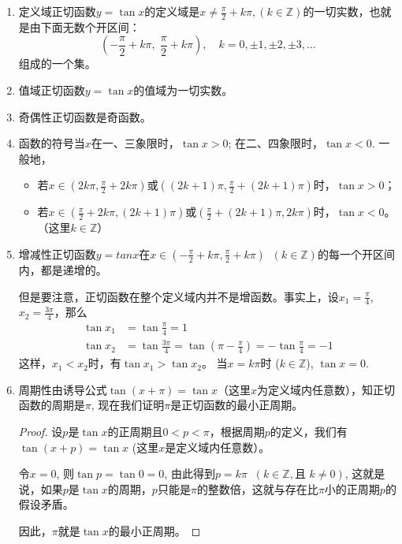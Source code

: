 \begin{enumerate}
    \item 定义域\quad  正切函数$y=\tan x$的定义域是$x\ne \frac{\pi}{2}+k\pi, 
(k\in\mathbb{Z})$的一切实数，也就是由下面无数个开区间：
\[\left(-\frac{\pi}{2}+k\pi,\; \frac{\pi}{2}+k\pi\right),\quad k=0,\pm1,\pm2,\pm3,\ldots \]
组成的一个集。
\item 值域\quad  正切函数$y=\tan x$的值域为一切实数。
\item 奇偶性\quad 正切函数是奇函数。
\item 函数的符号\quad 当$x$在一、三象限时，$\tan x>0$; 在二、四象限时，$\tan x<0$. 一般地，
\begin{itemize}
    \item 若$x\in\left(2k\pi,\frac{\pi}{2}+2k\pi\right)$或$\left((2k+1)\pi,\frac{\pi}{2}+(2k+1)\pi\right)$时，$\tan x>0$；
    \item 若$x\in\left(\frac{\pi}{2}+2k\pi,(2k+1)\pi\right)$或$\left(\frac{\pi}{2}+(2k+1)\pi, 2k\pi\right)$时，$\tan x<0$。（这里$k\in\mathbb{Z}$）
\end{itemize}

 \item 增减性\quad 正切函数$y=tan x$在$x\in\left(-\frac{\pi}{2}+k\pi,\frac{\pi}{2}+k\pi\right)\;\; (k\in\mathbb{Z})$的每一个开区间内，都是递增的。

 但是要注意，正切函数在整个定义域内并不是增函数。事实上，设$x_1=\frac{\pi}{4}$, $x_2=\frac{3\pi}{4}$，那么
 \[\begin{split}
     \tan x_1&=\tan\frac{\pi}{4}=1\\
     \tan x_2&=\tan\frac{3\pi}{4}=\tan\left(\pi-\frac{\pi}{4}\right)=-\tan\frac{\pi}{4}=-1
 \end{split}\]
这样，$x_1<x_2$时，有$\tan x_1>\tan x_2$。
 当$x=k\pi$时 ($k\in\mathbb{Z}$), $\tan x=0$.
 
 \item 周期性\quad 由诱导公式$\tan (x+\pi)=\tan x$（这里$x$为定义域内任意数），知正切函数的周期是$\pi$, 现在我们证明$\pi$是正切函数的最小正周期。
 
\begin{proof}
    设$p$是$\tan x$的正周期且$0<p<\pi$，根据周期$p$的定义，我们有
$\tan (x+p)=\tan x$ (这里$x$是定义域内任意数）。

令$x=0$, 则$\tan p=\tan 0=0$, 由此得到$p=k\pi\;\; (k\in\mathbb{Z}, \text{且 }k\ne 0)$, 这就是说，如果$p$是$\tan x$的周期，$p$只能是$\pi$的整数倍，这就与存在比$\pi$小的正周期$p$的假设矛盾。

因此，$\pi$就是$\tan x$的最小正周期。
\end{proof}


\end{enumerate}
